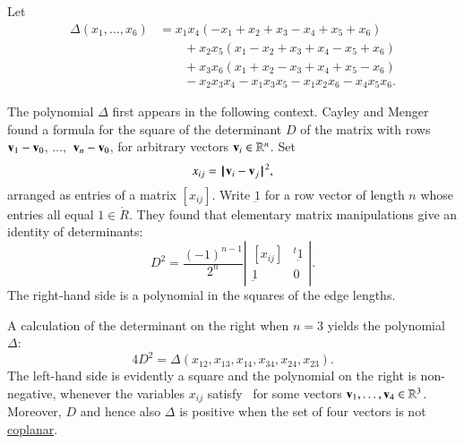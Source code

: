 \begin{definition}[$\Delta$]\label{def:delta}
  Let
\begin{displaymath}
\begin{array}{lll}
\Delta(x_1,\ldots,x_6) &= x_1 x_4 (- x_1+x_2+x_3- x_4+x_5+x_6)\\
&\qquad+x_2 x_5 (x_1- x_2+x_3+x_4- x_5+x_6)\\
&\qquad+x_3 x_6 (x_1+x_2- x_3+x_4+x_5- x_6)\\
&\qquad- x_2 x_3 x_4- x_1 x_3 x_5- x_1 x_2 x_6- x_4 x_5 x_6.
\end{array}
\end{displaymath}
\end{definition}
%
%

\begin{remark}\label{rem:cayley}
  The polynomial $\Delta$ first appears in the following context.
  Cayley and Menger found a formula for the square of the determinant
  $D$ of the matrix with rows ${\mathbf v}_1-{\mathbf v}_0$, $\ldots,$ ${\mathbf v}_n-{\mathbf v}_0$, for
  arbitrary vectors ${\mathbf v}_i\in\mathbb{R}^n$.  Set
\begin{equation}\label{eqn:xij}
x_{ij} = \norm{\v_i}{\v_j}^2,
\end{equation}
arranged as entries of a matrix $[x_{ij}]$.
Write $\underbar 1$ for a row vector of length $n$ 
whose entries all equal $1\in\ring{R}$.
They found that elementary matrix manipulations give an identity
of determinants:
\begin{displaymath}
D^2 = \frac{(-1)^{n-1}}{2^n}
\left|\begin{matrix}[x_{ij}]& {}^t{\underbar 1}\\ {\underbar 1}& 0
\end{matrix}\right|.
\end{displaymath}
The right-hand side is a polynomial in the squares of the edge lengths.

A calculation of the determinant on the right when $n=3$ yields 
the polynomial $\Delta$:
\begin{displaymath}
4 D^2 = \Delta(x_{12},x_{13},x_{14},x_{34},x_{24},x_{23}).
\end{displaymath}
The left-hand side is evidently a square and the polynomial on the
right is non-negative, whenever the variables $x_{ij}$
satisfy~ for some vectors
${\mathbf v}_1,\ldots,{\mathbf v}_4\in\mathbb{R}^3$.  Moreover, $D$ and hence also
$\Delta$ is positive when the set of four vectors is not
\hyperref[def:plane]{coplanar}.
\end{remark}
%
%
%
%
%

